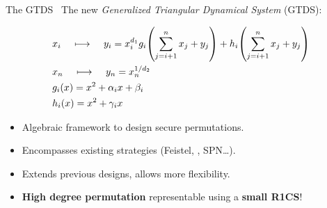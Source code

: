 \documentclass[beamer={10pt,xcolor=dvipsnames},target=mst]{thud}
\begin{document}
\begin{frame}{The GTDS~\cite{RoyS2022}}
  The new \emph{Generalized Triangular Dynamical System} (GTDS):
  \begin{center}
    \begin{align*}
      & x_{i} \;\;\;\; \longmapsto \;\;\;\; y_i = x_i^{d_1}\call{g_i}{\sum_{j=i+1}^{n}{x_j + y_j}} + \call{h_i}{\sum_{j=i+1}^{n}{x_j + y_j}}  \\
      & x_{n} \;\;\;\; \longmapsto \;\;\;\; y_n = x_{n}^{1/d_2} \\
      & \call{g_i}{x} = x^2 + \alpha_{i}x + \beta_{i} \\ 
      & \call{h_i}{x} = x^2 + \gamma_{i}x
    \end{align*}
  \end{center}

  \begin{itemize}
    \item Algebraic framework to design secure permutations.
    \item Encompasses existing strategies (Feistel, \Horst{}, SPN\dots).
    \item Extends previous designs, allows more flexibility. 
    \item \textbf{High degree permutation} representable using a \textbf{small R1CS}!
  \end{itemize}
\end{frame}
\end{document}
